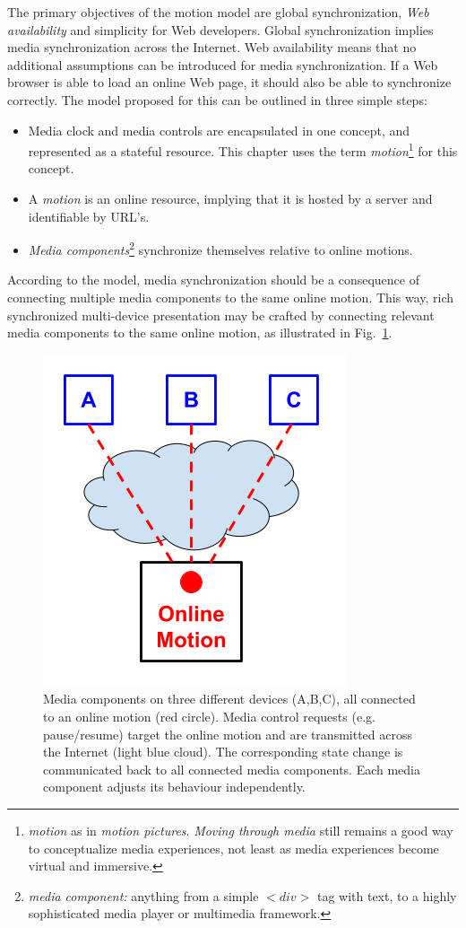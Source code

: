 The primary objectives of the motion model are global synchronization,
\emph{Web availability} and simplicity for Web developers. Global
synchronization implies media synchronization across the Internet. Web
availability means that no additional assumptions can be introduced for media
synchronization. If a Web browser is able to load an online Web page, it
should also be able to synchronize correctly. The model proposed for this can
be outlined in three simple steps:

\begin{itemize}
\item{Media clock and media controls are encapsulated in one concept, and
represented as a stateful resource. This chapter uses the term \emph{motion}\footnote{\emph{motion} as in \emph{motion pictures}. \emph{Moving through media} still remains a good way to conceptualize media experiences, not least as media experiences become virtual and immersive.
} for this
concept.} 
\item{A \emph{motion} is an online resource, implying that it is hosted by a
server and identifiable by URL's.}
\item{\emph{Media components}\footnote{\emph{media component:} anything from a simple $<div>$ tag with text, to a highly sophisticated media player or multimedia framework.
} synchronize themselves relative to online motions.}
\end{itemize}

According to the model, media synchronization should be a consequence of
connecting multiple media components to the same online motion. This way, rich
synchronized multi-device presentation may be crafted by connecting relevant
media components to the same online motion, as illustrated in Fig.~\ref{fig:model}.

\begin{figure}[h]
\centering
\includegraphics[scale=.4]{fig/motion-model.png}
\caption{Media components on three different devices (A,B,C), all connected to an online motion
(red circle). Media control requests (e.g. pause/resume) target the online motion and are transmitted across the Internet (light blue cloud). The corresponding state change is
communicated back to all connected media components. Each media component
adjusts its behaviour independently.}
\label{fig:model}
\end{figure}

